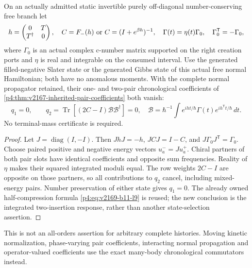 \documentclass[12pt,a4paper]{article}
\begin{document}
\begin{theorem}
\label{p5c:v2188:thm:chiralchronologicalzero}
On an actually admitted static invertible purely off-diagonal
number-conserving free branch let
\[
 h=\begin{pmatrix}0&T\\T^\dagger&0\end{pmatrix},\quad
 C=F_-(h)\ \hbox{or}\ C=(I+e^{\beta h})^{-1},\quad
 \Gamma(t)=\eta(t)\Gamma_0,\quad
 \Gamma_0^{\mathsf T}=-\Gamma_0 ,
\]
where \(\Gamma_0\) is an actual complex c-number matrix supported on the
right creation ports and \(\eta\) is real and integrable on the consumed
interval. Use the generated filled-negative Slater state or the generated
Gibbs state of this actual free normal Hamiltonian; both have no anomalous
moments. With the complete normal propagator retained, their one- and
two-pair chronological coefficients of
\ref{p4:thm:v2167-inherited-pair-coefficients} both vanish:
\begin{equation}
 q_1=0,\qquad
 q_2=\operatorname{Tr}[(2C-I)\mathcal B\mathcal B^\dagger]=0,\quad
 \mathcal B=\hbar^{-1}\int e^{iht/\hbar}\Gamma(t)e^{ih^{\mathsf T}t/\hbar}\,dt .
 \label{p5c:v2188:eq:chiralchronologicalzero}
\end{equation}
No terminal-mass certificate is required.
\end{theorem}
\begin{proof}
Let \(J=\operatorname{diag}(I,-I)\). Then \(JhJ=-h\),
\(JCJ=I-C\), and \(J\Gamma_0J^{\mathsf T}=\Gamma_0\).
Choose paired positive and negative energy vectors \(u_a^-\!=Ju_a^+\).
Chiral partners of both pair slots have identical coefficients and
opposite sum frequencies. Reality of \(\eta\) makes their squared
integrated moduli equal. The row weights \(2C-I\) are opposite on
those partners, so all contributions to \(q_2\) cancel, including
mixed-energy pairs. Number preservation of either state gives \(q_1=0\).
The already owned half-compression formula
\ref{p4:eq:v2169-b11-l9} is reused; the new conclusion is the integrated
two-insertion response, rather than another state-selection assertion.
\end{proof}
This is not an all-orders assertion for arbitrary complete histories.
Moving kinetic normalization, phase-varying pair coefficients, interacting
normal propagation and operator-valued coefficients use the exact
many-body chronological commutators instead.
\end{document}
